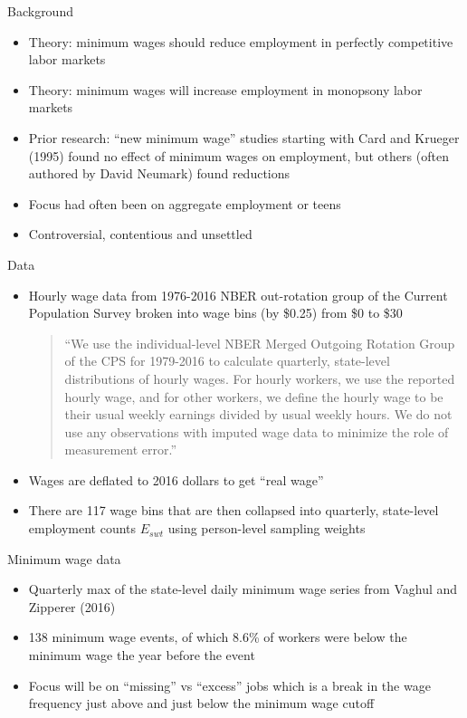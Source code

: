 \documentclass{beamer}
\begin{document}
\begin{frame}{Background}

\begin{itemize}
\item Theory: minimum wages should reduce employment in perfectly competitive labor markets
\item Theory: minimum wages will increase employment in monopsony labor markets 
\item Prior research: ``new minimum wage'' studies starting with Card and Krueger (1995) found no effect of minimum wages on employment, but others (often authored by David Neumark) found reductions
\item Focus had often been on aggregate employment or teens
\item Controversial, contentious and unsettled 
\end{itemize}

\end{frame}

\begin{frame}{Data}

\begin{itemize}
\item Hourly wage data from 1976-2016 NBER out-rotation group of the Current Population Survey broken into wage bins (by \$0.25) from \$0 to \$30
\begin{quote}
``We use the individual-level NBER Merged Outgoing Rotation Group of the CPS for 1979-2016 to calculate quarterly, state-level distributions of hourly wages. For hourly workers, we use the reported hourly wage, and for other workers, we define the hourly wage to be their usual weekly earnings divided by usual weekly hours.  We do not use any observations with imputed wage data to minimize the role of measurement error.''
\end{quote}
\item Wages are deflated to 2016 dollars to get ``real wage''
\item There are 117 wage bins that are then collapsed into quarterly, state-level employment counts $E_{swt}$ using person-level sampling weights
\end{itemize}

\end{frame}

\begin{frame}{Minimum wage data}

\begin{itemize}
\item Quarterly max of the state-level daily minimum wage series from Vaghul and Zipperer (2016)
\item 138 minimum wage events, of which 8.6\% of workers were below the minimum wage the year before the event
\item Focus will be on ``missing'' vs ``excess'' jobs which is a break in the wage frequency just above and just below the minimum wage cutoff
\end{itemize}

\end{frame}
\end{document}

